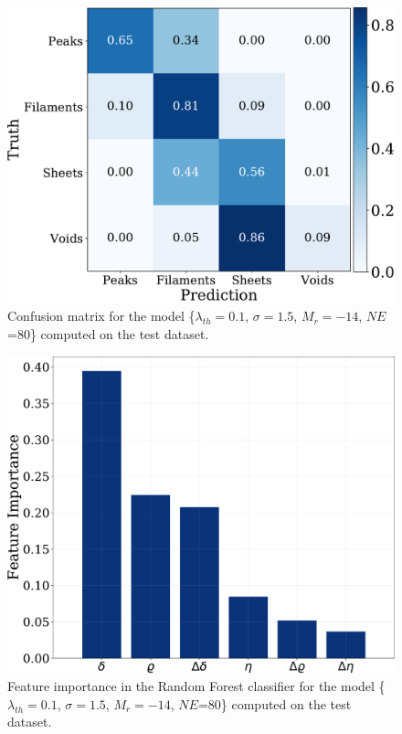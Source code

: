 \documentclass[usenatbib]{mnras}
\begin{document}
\begin{figure}
\centering
    \includegraphics[scale=0.35]{Figs/p_confusion_matrix_test.pdf}
\caption{Confusion matrix for the model 
      \{$\lambda_{th}=0.1$, $\sigma=1.5$, $M_r=-14$,
      $NE$=80\} computed on the test dataset.}
      \label{fig:confusion_matrix}
\end{figure}

\begin{figure}
    \includegraphics[scale=0.29]{Figs/p_features_importance_test.pdf}  
    \caption{
      Feature importance in the Random Forest classifier for the model
      \{$\lambda_{th}=0.1$, $\sigma=1.5$, $M_r=-14$,
      $NE$=80\} computed on the test dataset.}
    \label{fig:feature_importance}
\end{figure}
\end{document}
